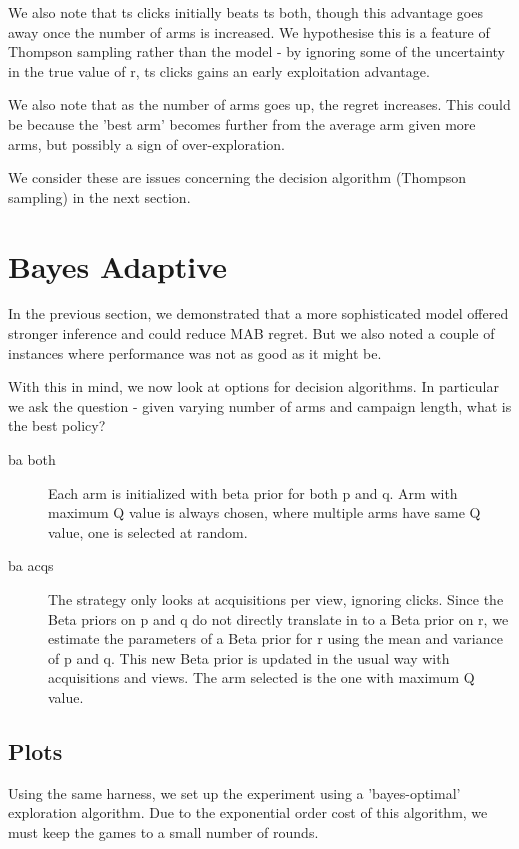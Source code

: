 \documentclass[11pt,a4,singlespacing,titlepagenumber=on]{scrreprt}
\numberwithin{equation}{chapter} %
\theoremstyle{remark}
\begin{document}
We also note that ts clicks initially beats ts both, though this advantage goes away once the number of arms is increased. We hypothesise this is a feature of Thompson sampling rather than the model - by ignoring some of the uncertainty in the true value of r, ts clicks gains an early exploitation advantage.

We also note that as the number of arms goes up, the regret increases. This could be because the 'best arm' becomes further from the average arm given more arms, but possibly a sign of over-exploration.

We consider these are issues concerning the decision algorithm (Thompson sampling) in the next section.

\section{ Bayes Adaptive }

In the previous section, we demonstrated that a more sophisticated model offered stronger inference and could reduce MAB regret. But we also noted a couple of instances where performance was not as good as it might be. 

With this in mind, we now look at options for decision algorithms. In particular we ask the question - given varying number of arms and campaign length, what is the best policy? 

\begin{description}
	\item[ba both] Each arm is initialized with beta prior for both p and q. Arm with maximum Q value is always chosen, where multiple arms have same Q value, one is selected at random.
	\item[ba acqs] The strategy only looks at acquisitions per view, ignoring clicks. Since the Beta priors on p and q do not directly translate in to a Beta prior on r, we estimate the parameters of a Beta prior for r using the mean and variance of p and q. This new Beta prior is updated in the usual way with acquisitions and views. The arm selected is the one with maximum Q value.
\end{description}




\subsection{Plots}

Using the same harness, we set up the experiment using a 'bayes-optimal' exploration algorithm. Due to the exponential order cost of this algorithm, we must keep the games to a small number of rounds. 
\end{document}
